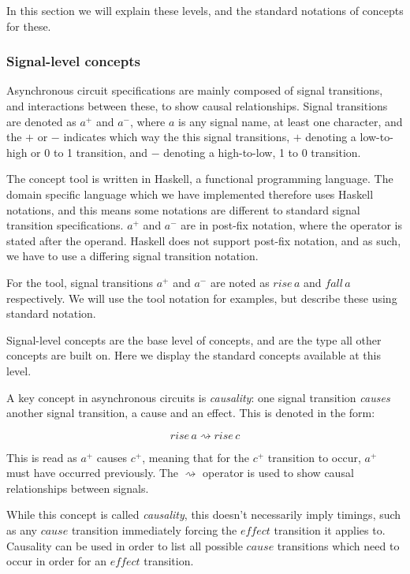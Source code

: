 \documentclass[british,conference,compsoc]{IEEEtran}
\begin{document}
In this section we will explain these levels, and the standard notations of 
concepts for these. 

\subsubsection{\label{signal-level}Signal-level concepts}Asynchronous circuit 
specifications are mainly composed of signal transitions, and interactions 
between these, to show causal relationships. Signal transitions are denoted as 
$a^{+}$ and $a^{-}$, where $a$ is any signal name, at least one character, and 
the $+$ or $-$ indicates which way the this signal transitions, $+$ denoting a 
low-to-high or 0 to 1 transition, and $-$ denoting a high-to-low, 1 to 0 
transition. 

The concept tool is written in Haskell, a functional programming language. The 
domain specific language which we have implemented therefore uses Haskell 
notations, and this means some notations are different to standard signal 
transition specifications. $a^{+}$ and $a^{-}$ are in post-fix notation, where 
the operator is stated after the operand. Haskell does not support post-fix 
notation, and as such, we have to use a differing signal transition notation. 

For the tool, signal transitions $a^{+}$ and $a^{-}$ are noted as $rise\,a$ and 
$fall\,a$ respectively. We will use the tool notation for examples, but 
describe these using standard notation.

Signal-level concepts are the base level of concepts, and are 
the type all other concepts are built on. Here we display the standard concepts
available at this level.

A key concept in asynchronous circuits is \emph{causality}:
one signal transition \emph{causes} another signal transition, a cause and an 
effect. This is denoted in the form: 

\[
rise\,a\rightsquigarrow rise\,c
\]

This is read as $a^{+}$ causes $c^{+}$, meaning that for the $c^{+}$ transition 
to occur, $a^{+}$ must have occurred previously. The $\rightsquigarrow$ 
operator is used to show causal relationships between signals.
 
While this concept is called \emph{causality}, this doesn't necessarily imply
timings, such as any $\mathit{cause}$ transition immediately forcing the
 $\mathit{effect}$ transition it applies to. Causality can be used in order to
list all possible $\mathit{cause}$ transitions which need to occur in order
 for an $\mathit{effect}$ transition.
\end{document}
